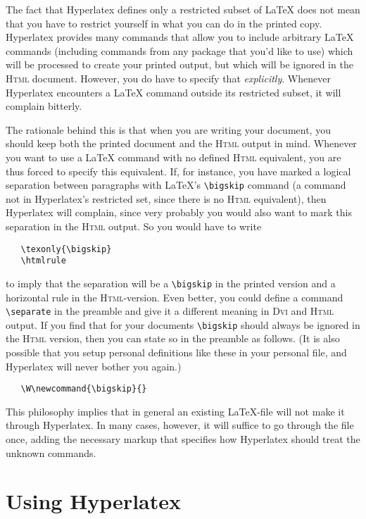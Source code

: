 \documentclass{article}
\newcommand{\+}{\verb+}
\renewcommand{\*}{\back{}}
\newcommand{\Html}{\textsc{Html}\xspace }
\newcommand{\latex}{\LaTeX\xspace }
\newcommand{\dvi}{\textsc{Dvi}\xspace }
\begin{document}
The fact that Hyperlatex defines only a restricted subset of \latex
does not mean that you have to restrict yourself in what you can do in
the printed copy. Hyperlatex provides many commands that allow you to
include arbitrary \latex commands (including commands from any package
that you'd like to use) which will be processed to create your printed
output, but which will be ignored in the \Html document.  However, you
do have to specify that \emph{explicitly}.  Whenever Hyperlatex
encounters a \latex command outside its restricted subset, it will
complain bitterly.

The rationale behind this is that when you are writing your document,
you should keep both the printed document and the \Html output in
mind.  Whenever you want to use a \latex command with no defined \Html
equivalent, you are thus forced to specify this equivalent.  If, for
instance, you have marked a logical separation between paragraphs with
\latex's \verb+\bigskip+ command (a command not in Hyperlatex's
restricted set, since there is no \Html equivalent), then Hyperlatex
will complain, since very probably you would also want to mark this
separation in the \Html output. So you would have to write
\begin{verbatim}
   \texonly{\bigskip}
   \htmlrule
\end{verbatim}
to imply that the separation will be a \verb+\bigskip+ in the printed
version and a horizontal rule in the \Html-version.  Even better, you
could define a command \verb+\separate+ in the preamble and give it a
different meaning in \dvi and \Html output. If you find that for your
documents \verb+\bigskip+ should always be ignored in the \Html
version, then you can state so in the preamble as follows. (It is also
possible that you setup personal definitions like these in your
personal  file, and Hyperlatex will never bother you
again.)
\begin{verbatim}
   \W\newcommand{\bigskip}{}
\end{verbatim}

This philosophy implies that in general an existing \latex-file will
not make it through Hyperlatex. In many cases, however, it will
suffice to go through the file once, adding the necessary markup that
specifies how Hyperlatex should treat the unknown commands.

\section{Using Hyperlatex}
\label{sec:using-hyperlatex}
\end{document}
